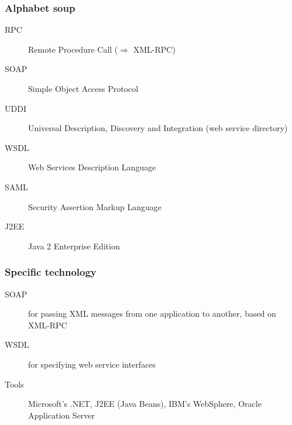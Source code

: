 

\frame
{
	\frametitle{Alphabet soup}
		
	\begin{description}
	
		\item[RPC] Remote Procedure Call (\(\Rightarrow\) XML-RPC)

		\item[SOAP] Simple Object Access Protocol

		\item[UDDI] Universal Description, Discovery and Integration
		(web service directory)

		\item[WSDL] Web Services Description Language

		\item[SAML] Security Assertion Markup Language

		\item[J2EE] Java 2 Enterprise Edition
		
	\end{description}
	
	\note{~}
}





\frame
{
	\frametitle{Specific technology}
		
	\begin{description}
	
		\item[SOAP] for passing XML messages from one application to
		another, based on XML-RPC

		\item[WSDL] for specifying web service interfaces

		\item[Tools] Microsoft's .NET, J2EE (Java Beans), IBM's
		WebSphere, Oracle Application Server
		
		
	\end{description}
}

\usebackgroundtemplate{}




